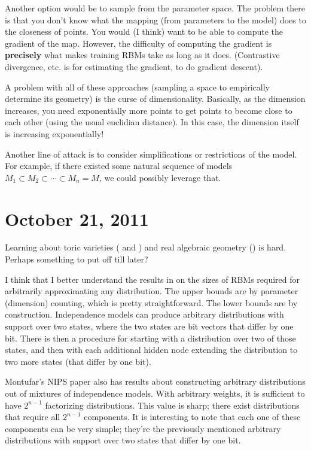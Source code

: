 \documentclass[11pt]{article}
\begin{document}
Another option would be to sample from the parameter space.  The problem there
is that you don't know what the mapping (from parameters to the model) does to
the closeness of points.  You would (I think) want to be able to compute the
gradient of the map.  However, the difficulty of computing the gradient is
\textbf{precisely} what makes training RBMs take as long as it does.
(Contrastive divergence, etc. is for estimating the gradient, to do gradient
descent).

A problem with all of these approaches (sampling a space to empirically
determine its geometry) is the curse of dimensionality.  Basically, as the
dimension increases, you need exponentially more points to get points to become
close to each other (using the usual euclidian distance).  In this case, the
dimension itself is increasing exponentially!

Another line of attack is to consider simplifications or restrictions of the
model.  For example, if there existed some natural sequence of models $M_1
\subset M_2 \subset \cdots \subset M_n = M$, we could possibly leverage that.

\section{October 21, 2011}

Learning about toric varieties (\cite{CLS09} and \cite{CLO98}) and real
algebraic geometry (\cite{Cos09}) is hard.  Perhaps something to put off till
later?

I think that I better understand the results in \cite{Mon10} on the sizes of
RBMs required for arbitrarily approximating any distribution.  The upper bounds
are by parameter (dimension) counting, which is pretty straightforward.  The
lower bounds are by construction.  Independence models can produce arbitrary
distributions with support over two states, where the two states are bit vectors
that differ by one bit.  There is then a procedure for starting with a
distribution over two of those states, and then with each additional hidden node
extending the distribution to two more states (that differ by one bit).

Montufar's NIPS paper also has results about constructing arbitrary
distributions out of mixtures of independence models.  With arbitrary weights,
it is sufficient to have $2^{n-1}$ factorizing distributions.  This value is
sharp; there exist distributions that require all $2^{n-1}$ components.
It is interesting to note that each one of these components can be very simple;
they're the previously mentioned arbitrary distributions with support over two
states that differ by one bit.
\end{document}
